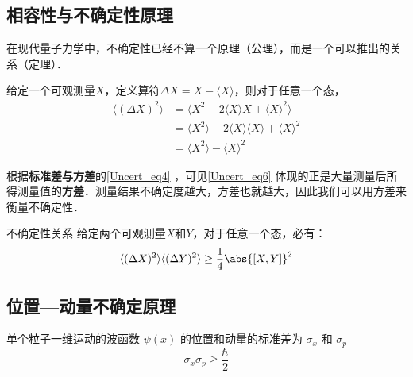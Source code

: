 


\subsection{相容性与不确定性原理}

在现代量子力学中，不确定性已经不算一个原理（公理），而是一个可以推出的关系（定理）．

给定一个可观测量$X$，定义算符$\Delta X=X-\langle X \rangle$，则对于任意一个态，
\begin{equation}\label{Uncert_eq6}
\begin{aligned}
\langle (\Delta X)^2 \rangle &= \langle X^2-2\langle X \rangle X + \langle X \rangle^2 \rangle\\
&=\langle X^2\rangle -2\langle X \rangle \langle X \rangle + \langle X \rangle^2\\
&=\langle X^2 \rangle - \langle X \rangle^2
\end{aligned}
\end{equation}

根据\textbf{标准差与方差}的\autoref{Uncert_eq4} ，可见\autoref{Uncert_eq6} 体现的正是大量测量后所得测量值的\textbf{方差}．测量结果不确定度越大，方差也就越大，因此我们可以用方差来衡量不确定性．

\begin{theorem}{不确定性关系}
给定两个可观测量$X$和$Y$，对于任意一个态，必有：
\begin{equation}
\langle (\Delta X)^2 \rangle\langle (\Delta Y)^2 \rangle \geq \frac{1}{4}\abs{[X, Y]}^2
\end{equation}
\end{theorem}







\subsection{位置—动量不确定原理}
单个粒子一维运动的波函数 $\psi(x)$ 的位置和动量的标准差为 $\sigma_x$ 和 $\sigma_p$
\begin{equation}\label{Uncert_eq2}
\sigma_x \sigma_p \geqslant \frac{\hbar}{2}
\end{equation}

